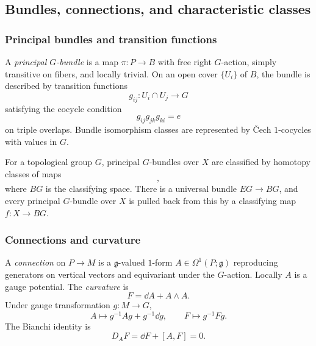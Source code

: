 \subsection{Bundles, connections, and characteristic classes}

\subsubsection{Principal bundles and transition functions}

A \emph{principal $G$-bundle} is a map $\pi : P \to B$ with free right $G$-action, simply transitive on fibers, and locally trivial. On an open cover $\{U_i\}$ of $B$, the bundle is described by transition functions
\begin{equation}
  g_{ij} : U_i \cap U_j \to G
\end{equation}
satisfying the cocycle condition
\begin{equation}
  g_{ij} g_{jk} g_{ki} = e
\end{equation}
on triple overlaps. Bundle isomorphism classes are represented by Čech $1$-cocycles with values in $G$.

For a topological group $G$, principal $G$-bundles over $X$ are classified by homotopy classes of maps
\begin{equation}
  [X,BG],
\end{equation}
where $BG$ is the classifying space. There is a universal bundle $EG \to BG$, and every principal $G$-bundle over $X$ is pulled back from this by a classifying map $f : X \to BG$.

\subsubsection{Connections and curvature}

A \emph{connection} on $P \to M$ is a $\mathfrak g$-valued $1$-form $A \in \Omega^1(P;\mathfrak g)$ reproducing generators on vertical vectors and equivariant under the $G$-action. Locally $A$ is a gauge potential. The \emph{curvature} is
\begin{equation}
  F = \dd A + A \wedge A.
\end{equation}
Under gauge transformation $g : M \to G$,
\begin{equation}
  A \mapsto g^{-1}Ag + g^{-1}\dd g,
  \qquad
  F \mapsto g^{-1}Fg.
\end{equation}
The Bianchi identity is
\begin{equation}
  D_A F = \dd F + [A,F]=0.
\end{equation}

